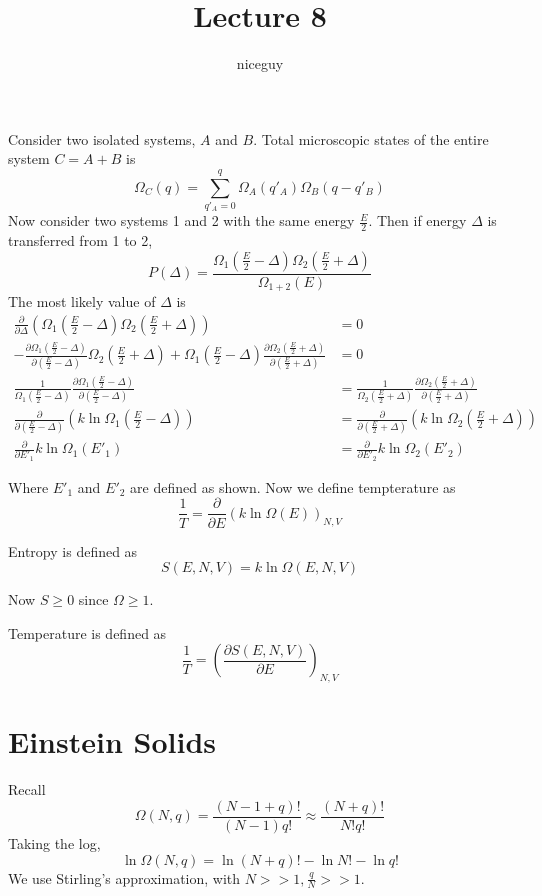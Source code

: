 \documentclass[12pt]{article}
\author{niceguy}
\title{Lecture 8}
\begin{document}
\maketitle

\section{}

Consider two isolated systems, $A$ and $B$. Total microscopic states of the entire system $C = A + B$ is
$$\Omega_C(q) = \sum_{q'_A=0}^q \Omega_A(q'_A)\Omega_B(q-q'_B)$$
Now consider two systems 1 and 2 with the same energy $\frac{E}{2}$. Then if energy $\Delta$ is transferred from 1 to 2,
$$P(\Delta) = \frac{\Omega_1\left(\frac{E}{2}-\Delta\right)\Omega_2\left(\frac{E}{2}+\Delta\right)}{\Omega_{1+2}(E)}$$
The most likely value of $\Delta$ is
\begin{align*}
	\frac{\partial}{\partial\Delta}\left(\Omega_1\left(\frac{E}{2}-\Delta\right)\Omega_2\left(\frac{E}{2}+\Delta\right)\right) &= 0 \\
	-\frac{\partial\Omega_1\left(\frac{E}{2}-\Delta\right)}{\partial\left(\frac{E}{2}-\Delta\right)}\Omega_2\left(\frac{E}{2}+\Delta\right) + \Omega_1\left(\frac{E}{2}-\Delta\right)\frac{\partial\Omega_2\left(\frac{E}{2}+\Delta\right)}{\partial\left(\frac{E}{2}+\Delta\right)} &= 0 \\
	\frac{1}{\Omega_1\left(\frac{E}{2}-\Delta\right)}\frac{\partial\Omega_1\left(\frac{E}{2}-\Delta\right)}{\partial\left(\frac{E}{2}-\Delta\right)} &= \frac{1}{\Omega_2\left(\frac{E}{2}+\Delta\right)}\frac{\partial\Omega_2\left(\frac{E}{2}+\Delta\right)}{\partial\left(\frac{E}{2}+\Delta\right)} \\
	\frac{\partial}{\partial\left(\frac{E}{2}-\Delta\right)}\left(k\ln\Omega_1\left(\frac{E}{2}-\Delta\right)\right) &= \frac{\partial}{\partial\left(\frac{E}{2}+\Delta\right)}\left(k\ln\Omega_2\left(\frac{E}{2}+\Delta\right)\right) \\
	\frac{\partial}{\partial E'_1} k\ln\Omega_1(E'_1) &= \frac{\partial}{\partial E'_2} k\ln\Omega_2(E'_2)
\end{align*}

Where $E'_1$ and $E'_2$ are defined as shown. Now we define tempterature as
$$\frac{1}{T} = \frac{\partial}{\partial E}(k\ln\Omega(E))_{N,V}$$

\begin{defn}
	Entropy is defined as
	$$S(E,N,V) = k\ln\Omega(E,N,V)$$
\end{defn}

Now $S \geq 0$ since $\Omega \geq 1$.

\begin{defn}
	Temperature is defined as
	$$\frac{1}{T} = \left(\frac{\partial S(E,N,V)}{\partial E}\right)_{N,V}$$
\end{defn}

\section{Einstein Solids}

Recall
$$\Omega(N,q) = \frac{(N-1+q)!}{(N-1)q!} \approx \frac{(N+q)!}{N!q!}$$
Taking the log,
$$\ln\Omega(N,q) = \ln(N+q)! - \ln N! - \ln q!$$
We use Stirling's approximation, with $N >> 1, \frac{q}{N} >> 1$.
\end{document}
